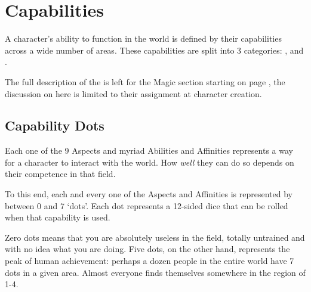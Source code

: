 
\newcommand\abilityRow[2]
{
	\imp{#1} & \parbox[t]{6.8 cm}{\raggedright #2} \\
}

\newcommand\abilityTable[1]
{
	\small
	\begin{center}
		\begin{rndtable}{r l}
		\bf Ability	& \bf Description \\
		#1
		\end{rndtable}
	\end{center}
}
\def\cc{\cellcolor{\tablecolorhead}\bf}
\newcommand\fourRow[4]{{\cc \bf \key{#1}}	&	\imp{#2}	&	\imp{#3}	&	\imp{#4} \\}



\chapter{Capabilities}\label{C:Aspects}

A character's ability to function in the world is defined by their capabilities across a wide number of areas. These capabilities are split into 3 categories: ,  and . 

The full description of the  is left for the Magic section starting on page \pageref{C:Magic}, the discussion on  here is limited to their assignment at character creation. 

\section{Capability Dots}

Each one of the 9 Aspects and myriad Abilities and Affinities represents a way for a character to interact with the world. How {\it well} they can do so depends on their competence in that field. 

To this end, each and every one of the Aspects and Affinities is represented by between 0 and 7 `dots'. Each dot represents a 12-sided dice that can be rolled when that capability is used. 

Zero dots means that you are absolutely useless in the field, totally untrained and with no idea what you are doing. Five dots, on the other hand, represents the peak of human achievement: perhaps a dozen people in the entire world have 7 dots in a given area. Almost everyone finds themselves somewhere in the region of 1-4. 

